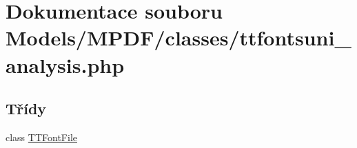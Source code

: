 \hypertarget{ttfontsuni__analysis_8php}{\section{Dokumentace souboru Models/\-M\-P\-D\-F/classes/ttfontsuni\-\_\-analysis.php}
\label{ttfontsuni__analysis_8php}
}
\subsection*{Třídy}
\begin{DoxyCompactItemize}
\item 
class \hyperlink{class_t_t_font_file}{T\-T\-Font\-File}
\end{DoxyCompactItemize}
